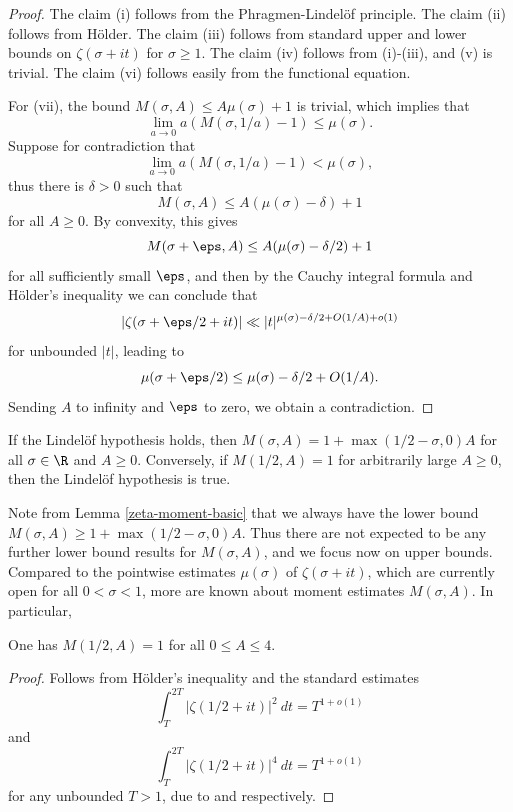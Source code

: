 \begin{proof} The claim (i) follows from the Phragmen-Lindel\"of principle.  The claim (ii) follows from H\"older.  The claim (iii) follows from standard upper and lower bounds on $\zeta(\sigma+it)$ for $\sigma \geq 1$. The claim (iv) follows from (i)-(iii), and (v) is trivial. The claim (vi) follows easily from the functional equation.

For (vii), the bound $M(\sigma,A) \leq A \mu(\sigma) + 1$ is trivial, which implies that
$$ \lim_{a \to 0} a(M(\sigma,1/a)-1) \leq \mu(\sigma).$$
Suppose for contradiction that
$$ \lim_{a \to 0} a(M(\sigma,1/a)-1) < \mu(\sigma),$$
thus there is $\delta>0$ such that
$$M(\sigma,A) \leq A (\mu(\sigma)-\delta) + 1$$
for all $A\geq 0$.  By convexity, this gives
$$M(\sigma+\eps,A) \leq A (\mu(\sigma)-\delta/2) + 1$$
for all sufficiently small $\eps$, and then by the Cauchy integral formula and H\"older's inequality we can conclude that
$$ |\zeta(\sigma+\eps/2 +it)| \ll |t|^{\mu(\sigma)-\delta/2 + O(1/A) + o(1)} $$
for unbounded $|t|$, leading to
$$ \mu(\sigma+\eps/2) \leq \mu(\sigma)-\delta/2 + O(1/A).$$
Sending $A$ to infinity and $\eps$ to zero, we obtain a contradiction.
\end{proof}

\begin{corollary}\label{moment_from_lindelof} If the Lindel\"of hypothesis holds, then $M(\sigma,A) = 1 + \max(1/2-\sigma,0) A$ for all $\sigma \in \R$ and $A \geq 0$. Conversely, if $M(1/2, A) = 1$ for arbitrarily large $A \ge 0$, then the Lindel\"of hypothesis is true.
\end{corollary}

Note from Lemma \ref{zeta-moment-basic} that we always have the lower bound $M(\sigma,A) \geq 1 + \max(1/2-\sigma,0) A$.  Thus there are not expected to be any further lower bound results for $M(\sigma,A)$, and we focus now on upper bounds. Compared to the pointwise estimates $\mu(\sigma)$ of $\zeta(\sigma + it)$, which are currently open for all $0 < \sigma < 1$, more are known about moment estimates $M(\sigma, A)$. In particular,

\begin{lemma}\label{mad_known_est}One has $M(1/2,A)=1$ for all $0 \leq A \leq 4$.
\end{lemma}
\begin{proof}
Follows from H\"older's inequality and the standard estimates
$$ \int_T^{2T} |\zeta(1/2+it)|^2\ dt = T^{1+o(1)}$$
and
$$ \int_T^{2T} |\zeta(1/2+it)|^4\ dt = T^{1+o(1)}$$
for any unbounded $T>1$, due to \cite{hardy_contributions_1916} and \cite{hardy_littlewood_approximate_1923} respectively.
\end{proof}

